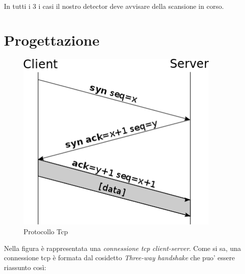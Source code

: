 \documentclass[a4paper,12pt]{article} %
\begin{document}
In tutti i 3 i casi il nostro detector deve avvisare della scansione in corso.







\section{Progettazione}

\begin{figure}[htbp]
\centering
\includegraphics[width=10cm]{tcp.png}
\caption{\label{Protocollo tcp} Protocollo Tcp}
\end{figure}



Nella figura è rappresentata una \emph{connessione tcp} \emph{client-server}. Come si sa, una connessione tcp è formata dal cosidetto
\emph{Three-way handshake} che puo' essere riassunto così:
\end{document}
